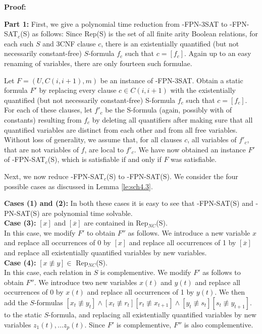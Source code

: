 \noindent
{\bf Proof:} 

\smallskip

\noindent
{\bf  Part 1:}
First, we give a polynomial time reduction 
from {-FPN-3SAT} to {-FPN-SAT$_c$(S)} as follows:
Since {\sf Rep(S)} is the set of all finite arity Boolean relations,
for each such $S$ and 3CNF clause $c$,
there is an existentially quantified (but not necessarily constant-free)
$S$-formula $f_c$ such that $c=[f_c]$.
Again up to an easy renaming of variables, there are only fourteen such
formulae.

Let $F = (U, C(i, i+1), m)$ be an instance of {-FPN-3SAT}. 
Obtain a static  formula $F'$
by replacing every clause $c \in C(i, i+1)$ with the 
existentially quantified (but not necessarily constant-free)
{\sf S}-formula $f_c$ such that $c=[f_c]$. For each of these clauses,
let $f'_c$ be the {\sf S}-formula (again, possibly with
of constants) resulting from $f_{c}$ by deleting
all quantifiers after making sure that all quantified variables are
distinct from each other and from all free variables.  Without loss of
generality, we assume that, for all clauses $c$,
all variables of $f'_c$, that are not variables
of $f$, are local to $f'_c$.
We have now obtained an instance $F'$ of {-FPN-SAT$_c$(S)}, 
which is satisfiable if and only if $F$ was satisfiable.

\noindent
Next, we now reduce {-FPN-SAT$_c$(S)} to {-FPN-SAT(S)}. 
We consider the four possible cases as discussed in Lemma \ref{le:sch4.3}.


\noindent
{\bf Cases (1) and (2):} 
In both these cases it is easy to see that {-FPN-SAT(S)}  and
{-PN-SAT(S)} are  polynomial time solvable.\\

\noindent
{\bf Case (3):} $[x]$ and $[\overline{x}]$ are contained in 
{\sf Rep$_{NC}$(S)}.\\
In this case, we modify $F'$ to obtain $F''$ as follows.
We introduce a new variable $x$ and replace all occurrences of
0 by $[x]$ and replace all occurrences of 1 by $[\overline{x}]$ and 
replace all existentially quantified variables by new variables. \\

\noindent
{\bf Case (4):} $[x \not\equiv y] \in$  {\sf Rep$_{NC}$(S)}.\\
In this case, each relation in $S$ is complementive.
We modify $F'$ as follows to obtain $F''$.
We introduce two new variables $x(t)$ and $y(t)$ and replace all occurrences of
0   by $x(t)$ and 
replace all occurrences of 1  by $y(t)$. We then add 
the $S$-formulas $[x_t \not\equiv y_t] \wedge [x_t \not \equiv r_{t}]
[r_t \not \equiv x_{t+1}] \wedge [y_t \not\equiv s_{t}]
[s_t \not\equiv y_{t+1}]$.  
to the static $S$-formula, and 
replacing all existentially quantified variables by new variables
$z_1(t), \ldots z_p(t)$.
Since $F'$ is complementive, $F''$ is also complementive.



